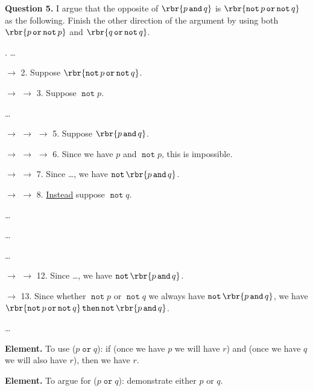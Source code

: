 \documentclass[oneside,12pt]{article}
\def\opthen{\mathop{\mathtt{then}}}
\def\opand{\mathop{\mathtt{and}}}
\def\opor{\mathop{\mathtt{or}}}
\def\opnot{\mathop{\mathtt{not}}}
\begin{document}
\hspace{-0.75in} \textbf{Question 5.} I argue that the opposite of $ \rbr{ p \opand q } $ is $ \rbr{ \opnot p \opor \opnot q } $ as the following. Finish the other direction of the argument by using both $ \rbr{ p \opor \opnot p } $ and $ \rbr{ q \opor \opnot q } $.
\begin{mdframed}
\small
{}. \ldots{}

\noindent $\longrightarrow$ 2. Suppose $ \rbr{ \opnot p \opor \opnot q } $.

\noindent $\longrightarrow$ $\longrightarrow$ 3. Suppose $ \opnot p $.

\noindent\ldots{}

\noindent $\longrightarrow$ $\longrightarrow$ $\longrightarrow$ 5. Suppose $ \rbr{ p \opand q } $.

\noindent $\longrightarrow$ $\longrightarrow$ $\longrightarrow$ 6. Since we have $p$ and $ \opnot p $, this is impossible.

\noindent $\longrightarrow$ $\longrightarrow$ 7. Since \ldots, we have $ \opnot \rbr{ p \opand q } $.

\noindent $\longrightarrow$ $\longrightarrow$ 8. \uline{Instead} suppose $ \opnot q $.

\noindent\ldots{}

\noindent\ldots{}

\noindent\ldots{}

\noindent $\longrightarrow$ $\longrightarrow$ 12. Since \ldots, we have $ \opnot \rbr{ p \opand q } $.

\noindent $\longrightarrow$ 13. Since whether $ \opnot p $ or $ \opnot q $ we always have $ \opnot \rbr{ p \opand q } $, we have $ \rbr{ \opnot p \opor \opnot q } \opthen \opnot \rbr{ p \opand q } $.

\noindent\ldots{}

\end{mdframed}

\leavevmode

\hspace{-0.75in}\llap{$\Box$ } \textbf{Element.} To use ($ p \opor q $): if (once we have $p$ we will have $r$) and (once we have $q$ we will also have $r$), then we have $r$.

\hspace{-0.75in}\llap{$\Box$ } \textbf{Element.} To argue for ($ p \opor q $): demonstrate either $p$ or $q$.
\end{document}
